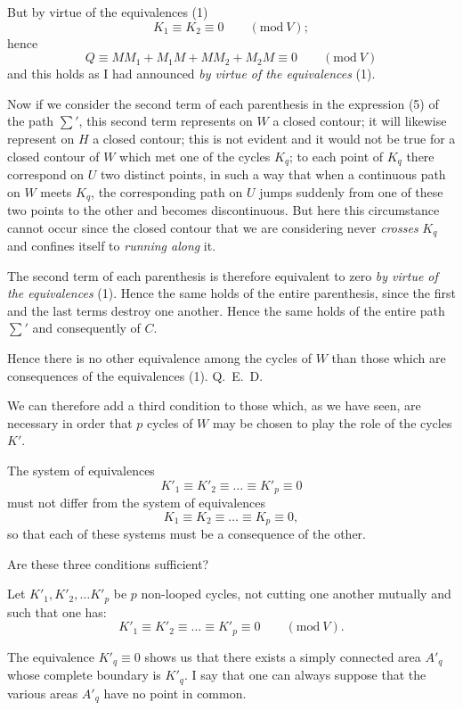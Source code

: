 \documentclass{article}
\begin{document}
But by virtue of the equivalences (1)
\[ K_{1} \equiv K_{2} \equiv 0 \qquad (\text{mod}\ V); \]
hence
\[ Q \equiv MM_{1} + M_{1}M + MM_{2} + M_{2}M \equiv 0 \qquad (\text{mod}\ V) \]
and this holds as I had announced \emph{by virtue of the equivalences} (1).


Now if we consider the second term of each parenthesis in the expression (5) of the path $\displaystyle\sum'$, this second term represents on $W$ a closed contour; it will likewise represent on $H$ a closed contour; this is not evident and it would not be true for a closed contour of $W$ which met one of the cycles $K_{q}$; to each point of $K_{q}$ there correspond on $U$ two distinct points, in such a way that when a continuous path on $W$ meets $K_{q}$, the corresponding path on $U$ jumps suddenly from one of these two points to the other and becomes discontinuous. But here this circumstance cannot occur since the closed contour that we are considering never \emph{crosses} $K_{q}$ and confines itself to \emph{running along} it.

The second term of each parenthesis is therefore equivalent to zero \emph{by virtue of the equivalences} (1). Hence the same holds of the entire parenthesis, since the first and the last terms destroy one another. Hence the same holds of the entire path $\displaystyle\sum'$ and consequently of $C$.

Hence there is no other equivalence among the cycles of $W$ than those which are consequences of the equivalences (1). Q.~E.~D.

We can therefore add a third condition to those which, as we have seen, are necessary in order that $p$ cycles of $W$ may be chosen to play the role of the cycles $K'$.

The system of equivalences
\[ K'_{1} \equiv K'_{2} \equiv \ldots \equiv K'_{p} \equiv 0 \]
must not differ from the system of equivalences
\[ K_{1} \equiv K_{2} \equiv \ldots \equiv K_{p} \equiv 0, \]
so that each of these systems must be a consequence of the other.

Are these three conditions sufficient?

Let $K'_{1}, K'_{2}, \ldots K'_{p}$ be $p$ non-looped cycles, not cutting one another mutually and such that one has:
\[ K'_{1} \equiv K'_{2} \equiv \ldots \equiv K'_{p} \equiv 0 \qquad (\text{mod}\ V). \]

The equivalence $K'_{q} \equiv 0$ shows us that there exists a simply connected area $A'_{q}$ whose complete boundary is $K'_{q}$. I say that one can always suppose that the various areas $A'_{q}$ have no point in common.
\end{document}
